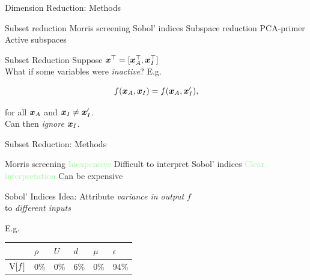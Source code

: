 \documentclass[14pt]{beamer}
\begin{document}
\begin{frame}{Dimension Reduction: Methods}
  \begin{outline}
    \1 Subset reduction
      \2 Morris screening
      \2 Sobol' indices
    \1 Subspace reduction
      \2 PCA-primer
      \2 Active subspaces
  \end{outline}
\end{frame}

\begin{frame}{Subset Reduction}
  Suppose $\boldsymbol{x}^{\top} = [\boldsymbol{x}_A^{\top}, \boldsymbol{x}_I^{\top}]$ \\
  What if some variables were \emph{inactive}? E.g.

  \begin{equation*}
    f(\boldsymbol{x}_A, \boldsymbol{x}_I) = f(\boldsymbol{x}_A, \boldsymbol{x}'_I),
  \end{equation*}

  \noindent for all $\boldsymbol{x}_A$ and $\boldsymbol{x}_I \neq \boldsymbol{x}'_I$. \\
  Can then \emph{ignore} $\boldsymbol{x}_I$.
\end{frame}

\begin{frame}{Subset Reduction: Methods}
  \begin{outline}
    \1 Morris screening
      \2 \textcolor{palegreen}{Inexpensive}
      \2 \textcolor{palered}{Difficult to interpret}
    \1 Sobol' indices
      \2 \textcolor{palegreen}{Clear interpretation}
      \2 \textcolor{palered}{Can be expensive}
  \end{outline}
\end{frame}

\begin{frame}{Sobol' Indices}
  Idea: Attribute \emph{variance in output} $f$ \\
  to \emph{different inputs}

  \bigskip E.g.
  \begin{table}
    \centering
    \begin{tabular}{@{}llllll@{}}
     & $\rho$ & $U$ & $d$ & $\mu$ & $\epsilon$\\
    \hline
    $\mathrm{V}[f]$ & 0\% & 0\% & 6\% & 0\% & 94\% \\
    \end{tabular}
  \end{table}

\end{frame}
\end{document}
